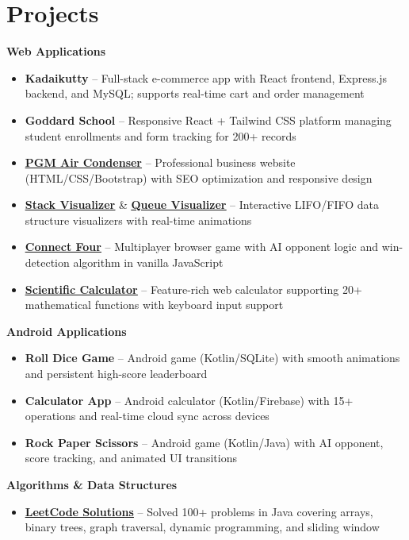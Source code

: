 \documentclass[letterpaper,10pt]{article}
\newcommand{\resumeItem}[1]{
  \item\small{{#1 \vspace{-2pt}}}
}
\newcommand{\resumeItemListStart}{\begin{itemize}[leftmargin=0.2in]\vspace{-2pt}}
\newcommand{\resumeItemListEnd}{\end{itemize}\vspace{-4pt}}
\begin{document}
\section{Projects}

\textbf{Web Applications}
\resumeItemListStart
  \resumeItem{\textbf{Kadaikutty} -- Full-stack e-commerce app with React frontend, Express.js backend, and MySQL; supports real-time cart and order management}
  \resumeItem{\textbf{Goddard School} -- Responsive React + Tailwind CSS platform managing student enrollments and form tracking for 200+ records}
  \resumeItem{\textbf{\href{https://arunkavitha1982.github.io/PGM-product/index.html}{\underline{PGM Air Condenser}}} -- Professional business website (HTML/CSS/Bootstrap) with SEO optimization and responsive design}
  \resumeItem{\textbf{\href{https://arunkumar-arjava.github.io/work/stack.html}{\underline{Stack Visualizer}}} \& \textbf{\href{https://arunkumar-arjava.github.io/work/queue.html}{\underline{Queue Visualizer}}} -- Interactive LIFO/FIFO data structure visualizers with real-time animations}
  \resumeItem{\textbf{\href{https://arunkumar-arjava.github.io/work/connect-four.html}{\underline{Connect Four}}} -- Multiplayer browser game with AI opponent logic and win-detection algorithm in vanilla JavaScript}
  \resumeItem{\textbf{\href{https://arunkavitha1982.github.io/javaScript/scientific_calculator.html}{\underline{Scientific Calculator}}} -- Feature-rich web calculator supporting 20+ mathematical functions with keyboard input support}
\resumeItemListEnd

\textbf{Android Applications}
\resumeItemListStart
  \resumeItem{\textbf{Roll Dice Game} -- Android game (Kotlin/SQLite) with smooth animations and persistent high-score leaderboard}
  \resumeItem{\textbf{Calculator App} -- Android calculator (Kotlin/Firebase) with 15+ operations and real-time cloud sync across devices}
  \resumeItem{\textbf{Rock Paper Scissors} -- Android game (Kotlin/Java) with AI opponent, score tracking, and animated UI transitions}
\resumeItemListEnd

\textbf{Algorithms \& Data Structures}
\resumeItemListStart
  \resumeItem{\textbf{\href{https://leetcode.com/u/arunkumar2005/}{\underline{LeetCode Solutions}}} -- Solved 100+ problems in Java covering arrays, binary trees, graph traversal, dynamic programming, and sliding window}
\resumeItemListEnd

\end{document}
